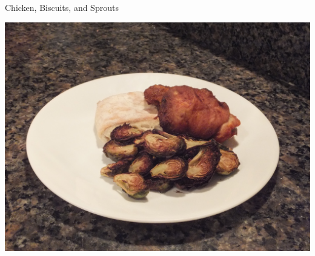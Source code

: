 \documentclass{recipe}
\begin{document}
\begin{recipe}{Chicken, Biscuits, and Sprouts}

  \begin{ingredients}
    \ingredientsep
    \ingredientsep
  \end{ingredients}

  \begin{images}
    \begin{image}
      \includegraphics[width=\linewidth,trim=150px 200px 250px 450px, clip=true]{oven_fried_chicken-01.jpeg}
    \end{image}
  \end{images}


\end{recipe}
\end{document}
